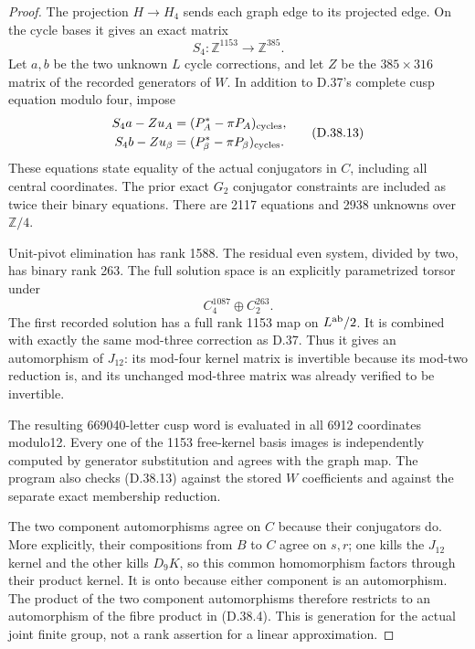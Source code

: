 \begin{proof}
The projection $H\to H_4$ sends each graph edge to
its projected edge. On the cycle bases it gives an
exact matrix
\[
 S_4:\mathbb Z^{1153}\longrightarrow\mathbb Z^{385}.
                                                               \tag{D.38.12}
\]
Let $a,b$ be the two unknown $L$ cycle corrections,
and let $Z$ be the $385\times316$ matrix of the
recorded generators of $W$. In addition to D.37's
complete cusp equation modulo four, impose
\[
 \begin{split}
 S_4a-Zu_A&=(P_A^*-\pi P_A)_{\rm cycles},\\
 S_4b-Zu_\beta&=(P_\beta^*-\pi P_\beta)_{\rm cycles}.
 \end{split}                                             \tag{D.38.13}
\]
These equations state equality of the actual
conjugators in $C$, including all central coordinates.
The prior exact $G_2$ conjugator constraints are included
as twice their binary equations. There are 2117
equations and 2938 unknowns over $\mathbb Z/4$.

Unit-pivot elimination has rank 1588. The residual even
system, divided by two, has binary rank 263. The full
solution space is an explicitly parametrized torsor
under
\[
 C_4^{1087}\oplus C_2^{263}.                              \tag{D.38.14}
\]
The first recorded solution has a full rank 1153 map
on $L^{\rm ab}/2$. It is combined with exactly the
same mod-three correction as D.37. Thus it gives an
automorphism of $J_{12}$: its mod-four kernel matrix
is invertible because its mod-two reduction is,
and its unchanged mod-three matrix was already
verified to be invertible.

The resulting 669040-letter cusp word is evaluated
in all 6912 coordinates modulo12. Every one of the
1153 free-kernel basis images is independently
computed by generator substitution and agrees with
the graph map. The program also checks (D.38.13)
against the stored $W$ coefficients and against
the separate exact membership reduction.

The two component automorphisms agree on $C$ because
their conjugators do. More explicitly, their
compositions from $B$ to $C$ agree on $s,r$; one
kills the $J_{12}$ kernel and the other kills
$D_9K$, so this common homomorphism factors through
their product kernel. It is onto because either
component is an automorphism. The product of the
two component automorphisms therefore restricts
to an automorphism of the fibre product in
(D.38.4). This is generation for the actual joint
finite group, not a rank assertion for a linear
approximation.


\end{proof}
